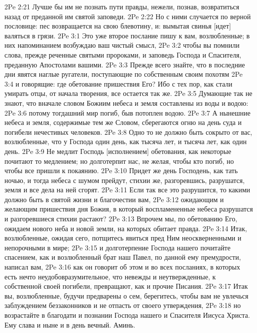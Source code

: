 2Pe 2:21  Лучше бы им не познать пути правды, нежели, познав, возвратиться назад от преданной им святой заповеди.
2Pe 2:22  Но с ними случается по верной пословице: пес возвращается на свою блевотину, и: вымытая свинья [идет] валяться в грязи.
2Pe 3:1  Это уже второе послание пишу к вам, возлюбленные; в них напоминанием возбуждаю ваш чистый смысл,
2Pe 3:2  чтобы вы помнили слова, прежде реченные святыми пророками, и заповедь Господа и Спасителя, преданную Апостолами вашими.
2Pe 3:3  Прежде всего знайте, что в последние дни явятся наглые ругатели, поступающие по собственным своим похотям
2Pe 3:4  и говорящие: где обетование пришествия Его? Ибо с тех пор, как стали умирать отцы, от начала творения, все остается так же.
2Pe 3:5  Думающие так не знают, что вначале словом Божиим небеса и земля составлены из воды и водою:
2Pe 3:6  потому тогдашний мир погиб, быв потоплен водою.
2Pe 3:7  А нынешние небеса и земля, содержимые тем же Словом, сберегаются огню на день суда и погибели нечестивых человеков.
2Pe 3:8  Одно то не должно быть сокрыто от вас, возлюбленные, что у Господа один день, как тысяча лет, и тысяча лет, как один день.
2Pe 3:9  Не медлит Господь [исполнением] обетования, как некоторые почитают то медлением; но долготерпит нас, не желая, чтобы кто погиб, но чтобы все пришли к покаянию.
2Pe 3:10  Придет же день Господень, как тать ночью, и тогда небеса с шумом прейдут, стихии же, разгоревшись, разрушатся, земля и все дела на ней сгорят.
2Pe 3:11  Если так все это разрушится, то какими должно быть в святой жизни и благочестии вам,
2Pe 3:12  ожидающим и желающим пришествия дня Божия, в который воспламененные небеса разрушатся и разгоревшиеся стихии растают?
2Pe 3:13  Впрочем мы, по обетованию Его, ожидаем нового неба и новой земли, на которых обитает правда.
2Pe 3:14  Итак, возлюбленные, ожидая сего, потщитесь явиться пред Ним неоскверненными и непорочными в мире;
2Pe 3:15  и долготерпение Господа нашего почитайте спасением, как и возлюбленный брат наш Павел, по данной ему премудрости, написал вам,
2Pe 3:16  как он говорит об этом и во всех посланиях, в которых есть нечто неудобовразумительное, что невежды и неутвержденные, к собственной своей погибели, превращают, как и прочие Писания.
2Pe 3:17  Итак вы, возлюбленные, будучи предварены о сем, берегитесь, чтобы вам не увлечься заблуждением беззаконников и не отпасть от своего утверждения,
2Pe 3:18  но возрастайте в благодати и познании Господа нашего и Спасителя Иисуса Христа. Ему слава и ныне и в день вечный. Аминь.



